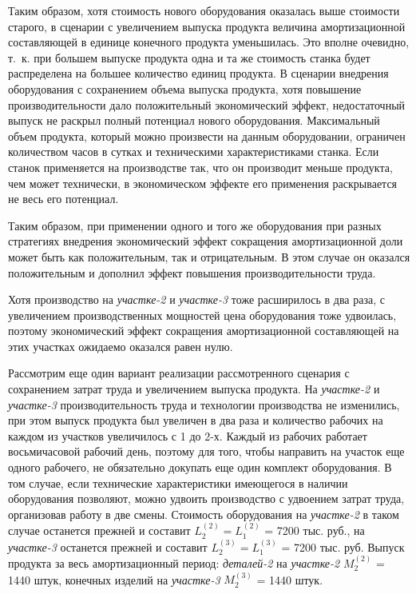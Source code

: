 \documentclass{article}
\let\textitorig\textit
\renewcommand{\textit}[1]{{\fontfamily{cmr}\selectfont \textitorig{#1}}}
\begin{document}
Таким образом, хотя стоимость нового оборудования оказалась выше стоимости старого, в сценарии с увеличением выпуска продукта величина амортизационной составляющей в единице конечного продукта уменьшилась. Это вполне очевидно, т.~к. при большем выпуске продукта одна и та же стоимость станка будет распределена на большее количество единиц продукта. В сценарии внедрения оборудования с сохранением объема выпуска продукта, хотя повышение производительности дало положительный экономический эффект, недостаточный выпуск не раскрыл полный потенциал нового оборудования. Максимальный объем продукта, который можно произвести на данным оборудовании, ограничен количеством часов в сутках и техническими характеристиками станка. Если станок применяется на производстве так, что он производит меньше продукта, чем может технически, в экономическом эффекте его применения раскрывается не весь его потенциал.

Таким образом, при применении одного и того же оборудования при разных стратегиях внедрения экономический эффект сокращения амортизационной доли может быть как положительным, так и отрицательным. В этом случае он оказался положительным и дополнил эффект повышения производительности труда.

Хотя производство на \textit{участке-2} и \textit{участке-3} тоже расширилось в два раза, с увеличением производственных мощностей цена оборудования тоже удвоилась, поэтому экономический эффект сокращения амортизационной составляющей на этих участках ожидаемо оказался равен нулю.

Рассмотрим еще один вариант реализации рассмотренного сценария с сохранением затрат труда и увеличением выпуска продукта. На \textit{участке-2} и \textit{участке-3} производительность труда и технологии производства не изменились, при этом выпуск продукта был увеличен в два раза и количество рабочих на каждом из участков увеличилось с 1 до 2-х. Каждый из рабочих работает восьмичасовой рабочий день, поэтому для того, чтобы направить на участок еще одного рабочего, не обязательно докупать еще один комплект оборудования. В том случае, если технические характеристики имеющегося в наличии оборудования позволяют, можно удвоить производство с удвоением затрат труда, организовав работу в две смены. Стоимость оборудования на \textit{участке-2} в таком случае останется прежней и составит $L_2^{(2)} = L_1^{(2)}$ = 7200 тыс. руб., на \textit{участке-3} останется прежней и составит $L_2^{(3)} = L_1^{(3)}$ = 7200 тыс. руб. Выпуск продукта за весь амортизационный период: \textit{деталей-2} на \textit{участке-2} $M_2^{(2)}$ = 1440 штук, конечных изделий на \textit{участке-3} $M_2^{(3)}$ = 1440 штук.
\end{document}
